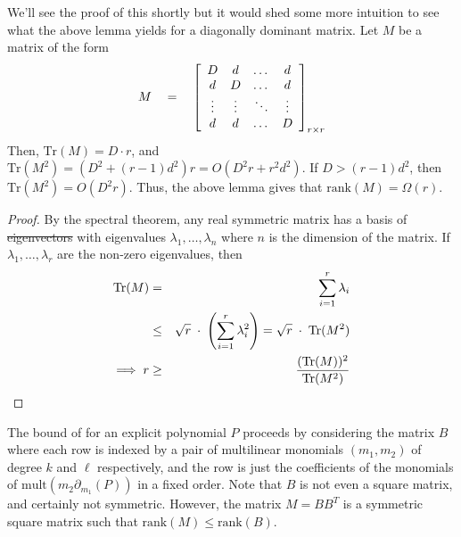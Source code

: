 \documentclass{beatcs}
\newcommand{\rank}{\mathrm{rank}}
\newcommand{\spaced}[1]{\quad#1\quad}
\providecommand{\DIFaddtex}[1]{{\protect\color{blue}\uwave{#1}}} %
\providecommand{\DIFdeltex}[1]{{\protect\color{red}\sout{#1}}}                      %
\providecommand{\DIFaddbegin}{} %
\providecommand{\DIFaddend}{} %
\providecommand{\DIFdelbegin}{} %
\providecommand{\DIFdelend}{} %
\providecommand{\DIFadd}[1]{\texorpdfstring{\DIFaddtex{#1}}{#1}} %
\providecommand{\DIFdel}[1]{\texorpdfstring{\DIFdeltex{#1}}{}} %
\begin{document}
We'll see the proof of this shortly but it would shed some more intuition to see what the above lemma yields for a diagonally dominant matrix. Let $M$ be a matrix of the form
\[
M \spaced{=} \insquare{\begin{array}{cccc}
D &  d & \dots &  d\\
 d & D & \dots & d\\
\vdots & \vdots & \ddots & \vdots \\
d & d & \dots & D
\end{array}}_{r \times r}
\]
Then, $\mathrm{Tr}(M) = D\cdot r$, and $\mathrm{Tr}(M^2) = (D^2 + (r-1)d^2)r = O(D^2 r + r^2 d^2)$. If $D > (r-1)d^2$, then $\mathrm{Tr}(M^2) = O(D^2r)$. Thus, the above lemma gives that $\rank(M) = \Omega(r)$. 
\begin{proof}
By the spectral theorem, any real symmetric matrix has a basis of \DIFdelbegin \DIFdel{eigenvectors }\DIFdelend \DIFaddbegin \DIFadd{eigen vectors }\DIFaddend with eigenvalues $\lambda_1,\dots, \lambda_n$ where $n$ is the dimension of the matrix. If $\lambda_1,\dots, \lambda_r$ are the non-zero eigenvalues, then 
\begin{eqnarray*}
\mathrm{Tr}(M) &   =  & \sum_{i=1}^r \lambda_i\\
& \leq & \sqrt{r} \;\cdot \; \left(\sum_{i=1}^r \lambda_i^2\right) = \sqrt{r}\;\cdot \; \mathrm{Tr}(M^2)\\
\implies r & \geq & \frac{(\mathrm{Tr}(M))^2}{\mathrm{Tr}(M^2)}
\end{eqnarray*}
\end{proof}

The bound of \cite{KLSS} for an explicit polynomial $P$ proceeds by considering the matrix $B$ where each row is indexed by a pair of multilinear monomials $(m_1,m_2)$  of degree $k$ and $\ell$ respectively, and the row is just the coefficients of the monomials of $\mathrm{mult}(m_2 \partial_{m_1}(P))$ in a fixed order. Note that $B$ is not even a square matrix, and certainly not symmetric. However, the matrix $M = B B^T$ is a symmetric square matrix such that $\rank(M) \leq \rank(B)$. \\
\end{document}
